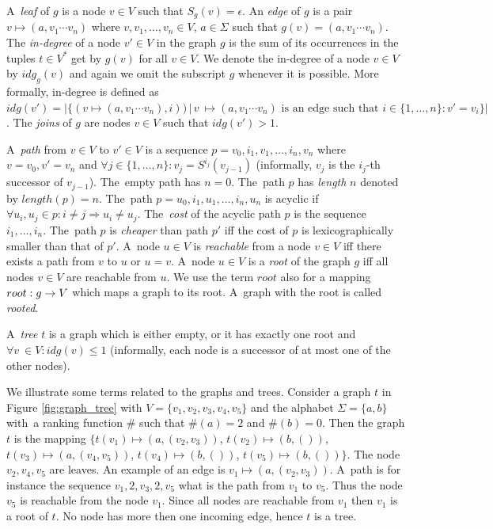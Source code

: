 A~\emph{leaf} of $g$ is a node $v \in V$ such that $S_g(v) = \epsilon$.
An \emph{edge} of $g$ is a pair $v \mapsto (a, v_1 \cdots v_n)$ where $v, v_1, \ldots, v_n \in V$,
$a \in \Sigma$ such that $g(v) = (a, v_1 \cdots v_n)$.
The \emph{in-degree} of a node $v' \in V$ in the graph $g$ is the sum of
its occurrences in the tuples $t \in V^{*}$ get by $g(v)$ for all $v \in V$.
We denote the in-degree of a node $v \in V$ by $idg_g(v)$ and again
we omit the subscript $g$ whenever it is possible.
More formally, in-degree is defined as
$idg(v') = |\{(v \mapsto (a, v_1 \cdots v_n),i)) \,|\, v~\mapsto (a, v_1 \cdots v_n)
\text{ is an edge such that } i \in \{1,\ldots,n\}: v' = v_i\}|$.
The \emph{joins} of $g$ are nodes $v \in V$ such that $idg(v') > 1$.

A~\emph{path} from $v\in V$ to $v' \in V$ is a sequence $p=v_0, i_1, v_1, \ldots, i_n, v_n$ where $v=v_0, v' = v_n$
and $\forall j \in \{1,\ldots,n\}: v_j = S^{i_j}(v_{j-1})$ (informally, $v_j$ is the $i_j$-th successor of $v_{j-1}$).
The~empty path has $n=0$.
The~path $p$ has \emph{length} $n$ denoted by $length(p) = n$.
The~path $p=u_0,i_1,u_1,\ldots,i_n,u_n$ is acyclic if $\forall u_i,u_j \in p: i \neq j \Rightarrow u_i \neq u_j$.
The~\emph{cost} of the acyclic path $p$ is the sequence $i_1, \ldots, i_n$.
The~path $p$ is \emph{cheaper} than path $p'$ iff the cost of $p$ is lexicographically smaller than that of $p'$. 
A~node $u \in V$ is \emph{reachable} from a node $v \in V$ iff there exists a path from $v$ to $u$ or $u=v$.
A~node $u \in V$ is a \emph{root} of the graph $g$ iff all nodes $v \in V$ are reachable from $u$.
We use the term $root$ also for a mapping $root: g \rightarrow V$ which maps a graph to its root.
A~graph with the root is called \emph{rooted}.

A~\emph{tree} $t$ is a graph which is either empty, or it has exactly one root and $\forall v~\in V: idg(v) \leq 1$ (informally,
each node is a successor of at most one of the other nodes).

\bexmp
We illustrate some terms related to the graphs and trees.
Consider a graph $t$ in Figure \ref{fig:graph_tree}
with $V=\{v_1,v_2,v_3,v_4,v_5\}$ and
the alphabet $\Sigma = \{a,b\}$ with~a ranking function $\#$ such that $\#(a) = 2$ and $\#(b) = 0$.
Then the graph $t$ is the mapping $\{t(v_1) \mapsto (a, (v_2,v_3))$, $t(v_2) \mapsto (b, ())$,
$t(v_3) \mapsto (a, (v_4, v_5))$, $t(v_4) \mapsto (b, ())$, $t(v_5) \mapsto (b, ())\}$.
The node $v_2, v_4, v_5$ are leaves.
An example of an edge is $v_1 \mapsto (a,(v_2,v_3))$.
A~path is for instance the sequence $v_1, 2, v_3, 2, v_5$
what is the path from $v_1$ to $v_5$.
Thus the node $v_5$ is reachable from the node $v_1$.
Since all nodes are reachable from $v_1$ then $v_1$ is a root of $t$.
No node has more then one incoming edge, hence $t$ is a tree.

